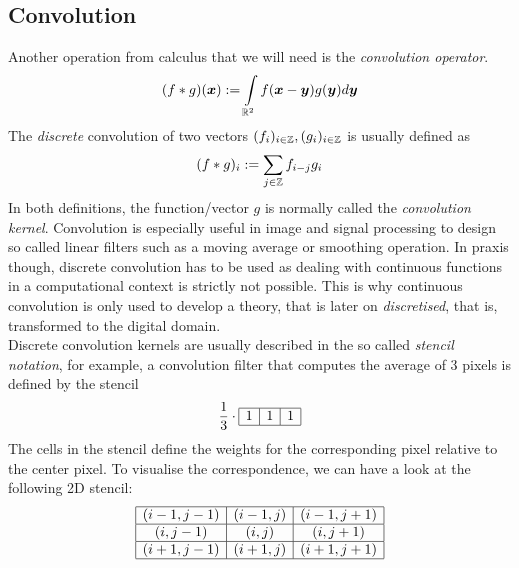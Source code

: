 \subsection{Convolution}
Another operation from calculus that we will need is the \textit{convolution operator}.\\
\begin{equation}
    (f * g)(\boldsymbol x) := \int\limits_{\mathbb{R}^2} f(\boldsymbol x-\boldsymbol y)g(\boldsymbol y)d\boldsymbol y\label{eq:2DConv}
\end{equation}
The \textit{discrete} convolution of two vectors $(f_i)_{i\in\mathbb{Z}}, (g_i)_{i\in\mathbb{Z}}$ is usually defined as
\begin{equation}
    (f*g)_i := \sum_{j\in\mathbb{Z}} f_{i-j}g_i
\end{equation}
In both definitions, the function/vector $g$ is normally called the \textit{convolution kernel}.
Convolution is especially useful in image and signal processing to design so called linear filters
such as a moving average or smoothing operation\cite{ipcv,dic}. 
In praxis though, discrete convolution has to be used as dealing with continuous functions in a
computational context is strictly not possible. This is why continuous convolution is only used to
develop a theory, that is later on \textit{discretised}, that is, transformed to the digital
domain.\\
Discrete convolution kernels are usually described in the so called \textit{stencil notation}, for
example, a convolution filter that computes the average of 3 pixels is defined by the stencil
\begin{equation}
    \frac{1}{3} \cdot \begin{array}{|c|c|c|}
       \hline
       1 & 1 & 1\\
       \hline
    \end{array}
\end{equation}
The cells in the stencil define the weights for the corresponding pixel relative to the center
pixel. To visualise the correspondence, we can have a look at the following 2D stencil:
\begin{equation}
    \begin{array}{|c|c|c|}
       \hline
       (i-1,j-1) & (i-1, j) & (i-1, j+1)\\\hline
       (i,j-1) & (i, j) & (i, j+1)\\\hline
       (i+1,j-1) & (i+1, j) & (i+1, j+1)\\\hline
    \end{array}
\end{equation}
